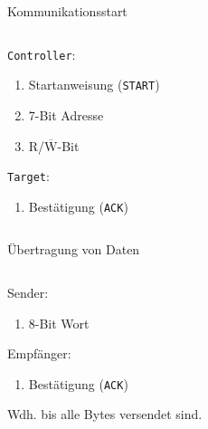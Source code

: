 \documentclass[12pt]{beamer}
\newcounter{listnum}
\begin{document}
	\begin{frame}{Kommunikationsstart}
		\begin{columns}
			\begin{column}{0.45\textwidth}
				\texttt{Controller}:
				\begin{enumerate}
					\item Startanweisung (\texttt{START})
					\item 7-Bit Adresse
					\item R/$\overline{\mbox{W}}$-Bit
					
					\setcounter{listnum}{\value{enumi}}
				\end{enumerate}
				\texttt{Target}:
				\begin{enumerate}
					\setcounter{enumi}{\value{listnum}}
					
					\item Bestätigung (\texttt{ACK})
				\end{enumerate}
			\end{column}
			\begin{column}{0.5\textwidth}
				
			\end{column}
		\end{columns}
		
	\end{frame}
	\begin{frame}{Übertragung von Daten}
		\begin{columns}
			\begin{column}{0.45\textwidth}
				Sender:
				\begin{enumerate}
					\item 8-Bit Wort
					
					\setcounter{listnum}{\value{enumi}}
				\end{enumerate}
				
				Empfänger:
				\begin{enumerate}
					\setcounter{enumi}{\value{listnum}}
					
					\item Bestätigung (\texttt{ACK})
				\end{enumerate}
				
				\vspace{5ex}
				Wdh. bis alle Bytes versendet sind.
			\end{column}
			\begin{column}{0.5\textwidth}
				
			\end{column}
		\end{columns}
	\end{frame}
\end{document}
